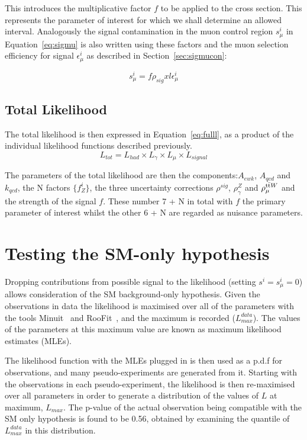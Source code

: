 This introduces the multiplicative factor $f$ to be applied to the cross section. This represents the parameter of interest for which we shall determine an allowed interval. Analogously the signal contamination in the muon control region  $s^{i}_{\mu}$ in Equation~\ref{eq:sigmu} is also written using these factors and the muon selection efficiency for signal $\epsilon^{i}_{\mu}$ as described in Section~\ref{sec:sigmucon}:

\begin{equation}
s^{i}_{\mu} = f \rho_{sig} x l \epsilon^{i}_{\mu}
\label{eq:sigmu}
\end{equation}

\subsection{Total Likelihood}

The total likelihood is then expressed in Equation~\ref{eq:fulll}, as a product of the individual likelihood functions described previously.
\begin{equation}
L_{tot} = L_{had} \times L_{\gamma} \times L_{\mu} \times L_{signal}
\label{eq:fulll}
\end{equation}

The parameters of the total likelihood are then the \RaT components:$A_{ewk}$, $A_{qcd}$ and $k_{qcd}$, the N factors $\{f^{i}_{Z}\}$, the three uncertainty corrections $\rho^{sig}$, $\rho^{Z}_{\gamma}$ and $\rho^{\textrm{t}\bar{\textrm{t}} W}_{\mu}$ and the strength of the signal $f$. These number 7 + N in total with $f$ the primary parameter of interest whilst the other 6 + N are regarded as nuisance parameters.

\section{Testing the SM-only hypothesis}

Dropping contributions from possible signal to the likelihood (setting $s^{i} = s^{i}_{\mu} = 0$) allows consideration of the SM background-only hypothesis. Given the observations in data the likelihood is maximised over all of the parameters with the tools Minuit~\cite{minuit} and RooFit~\cite{roofit}, and the maximum is recorded ($L^{data}_{max}$). The values of the parameters at this maximum value are known as maximum likelihood estimates (MLEs). 

The likelihood function with the MLEs plugged in is then used as a p.d.f for observations, and many pseudo-experiments are generated from it. Starting with the observations in each pseudo-experiment, the likelihood is then re-maximised over all parameters in order to generate a distribution of the values of $L$ at maximum, $L_{max}$. The p-value of the actual observation being compatible with the SM only hypothesis is found to be 0.56, obtained by examining the quantile of $L^{data}_{max}$ in this distribution. 

